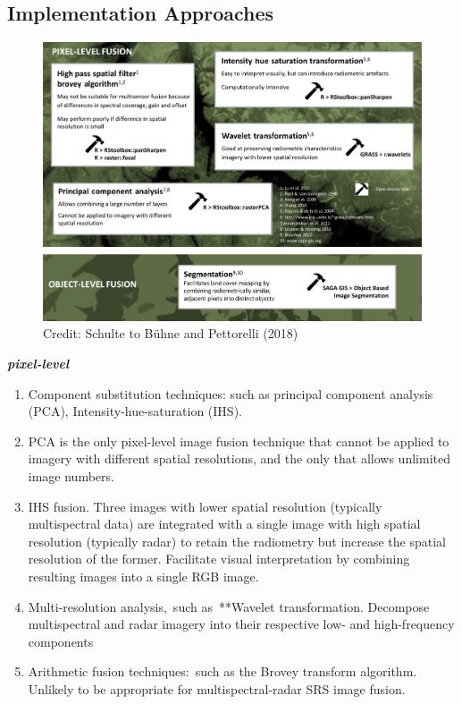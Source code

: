 \documentclass[
  letterpaper,
  DIV=11,
  numbers=noendperiod]{scrreprt}
\providecommand{\tightlist}{%
  \setlength{\itemsep}{0pt}\setlength{\parskip}{0pt}}\usepackage{longtable,booktabs,array}
\begin{document}
\hypertarget{implementation-approaches}{%
\subsection{Implementation Approaches}\label{implementation-approaches}}

\begin{figure}

{\centering \includegraphics{./images/Implementation approach.png}

}

\caption{\label{fig-impleApproach}Credit: Schulte to Bühne and
Pettorelli (2018)}

\end{figure}

\textbf{\emph{pixel-level}}

\begin{enumerate}
\def\labelenumi{\arabic{enumi}.}
\tightlist
\item
  Component substitution techniques: such as principal component
  analysis (PCA), Intensity-hue-saturation (IHS).~\\
\item
  PCA is the only pixel-level image fusion technique that cannot be
  applied to imagery with different spatial resolutions, and the only
  that allows unlimited image numbers.\\
\item
  IHS fusion. Three images with lower spatial resolution (typically
  multispectral data) are integrated with a single image with high
  spatial resolution (typically radar) to retain the radiometry but
  increase the spatial resolution of the former. Facilitate visual
  interpretation by combining resulting images into a single RGB
  image.\\
\item
  Multi-resolution analysis,~such as~**Wavelet transformation. Decompose
  multispectral and radar imagery into their respective low- and
  high-frequency components\\
\item
  Arithmetic fusion techniques:~such as the Brovey transform algorithm.
  Unlikely to be appropriate for multispectral-radar SRS image fusion.
\end{enumerate}
\end{document}
